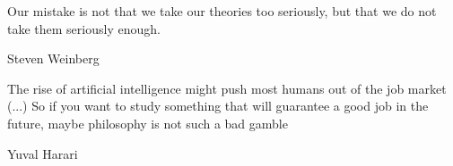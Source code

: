 \documentclass[./main_en.tex]{subfiles}
\begin{document}
\newpage
\renewcommand{\headrulewidth}{0pt}
\thispagestyle{fancy}
\fancyhf{} %
\fancyfoot{} %
\fancyfoot[C]{\thepage}

\epigraph{Our mistake is not that we take our theories too seriously, but that we do not take them seriously enough.}{Steven Weinberg}

\epigraph{The rise of artificial intelligence might push most humans out
of the job market (...) So if you want to study something that will guarantee a good job in the future, maybe philosophy is not such a bad gamble}{Yuval Harari}


\clearpage
\end{document}
